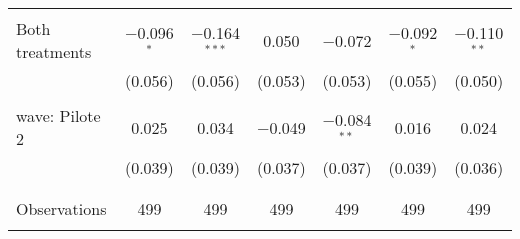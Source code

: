 \begin{tabular}{@{\extracolsep{5pt}}lcccccc}
  & & & & & & \\ 
 Both treatments & $-$0.096$^{*}$ & $-$0.164$^{***}$ & 0.050 & $-$0.072 & $-$0.092$^{*}$ & $-$0.110$^{**}$ \\ 
  & (0.056) & (0.056) & (0.053) & (0.053) & (0.055) & (0.050) \\ 
  & & & & & & \\ 
 wave: Pilote 2 & 0.025 & 0.034 & $-$0.049 & $-$0.084$^{**}$ & 0.016 & 0.024 \\ 
  & (0.039) & (0.039) & (0.037) & (0.037) & (0.039) & (0.036) \\ 
  & & & & & & \\ 
\hline \\[-1.8ex] 

Observations & 499 & 499 & 499 & 499 & 499 & 499 \\ 
\hline 
\hline \\[-1.8ex] 
\end{tabular} 